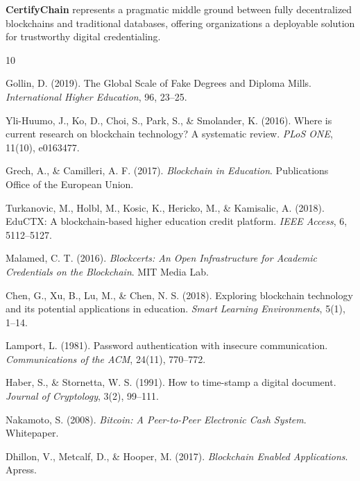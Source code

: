 \documentclass[10pt,twocolumn,a4paper]{article}
\newcommand{\certifychain}{\textbf{CertifyChain}}
\begin{document}
\certifychain{} represents a pragmatic middle ground between fully decentralized blockchains and traditional databases, offering organizations a deployable solution for trustworthy digital credentialing.

\begin{thebibliography}{10}

Gollin, D. (2019). The Global Scale of Fake Degrees and Diploma Mills. \textit{International Higher Education}, 96, 23--25.

Yli-Huumo, J., Ko, D., Choi, S., Park, S., \& Smolander, K. (2016). Where is current research on blockchain technology? A systematic review. \textit{PLoS ONE}, 11(10), e0163477.

Grech, A., \& Camilleri, A. F. (2017). \textit{Blockchain in Education}. Publications Office of the European Union.

Turkanovic, M., Holbl, M., Kosic, K., Hericko, M., \& Kamisalic, A. (2018). EduCTX: A blockchain-based higher education credit platform. \textit{IEEE Access}, 6, 5112--5127.

Malamed, C. T. (2016). \textit{Blockcerts: An Open Infrastructure for Academic Credentials on the Blockchain}. MIT Media Lab.

Chen, G., Xu, B., Lu, M., \& Chen, N. S. (2018). Exploring blockchain technology and its potential applications in education. \textit{Smart Learning Environments}, 5(1), 1--14.

Lamport, L. (1981). Password authentication with insecure communication. \textit{Communications of the ACM}, 24(11), 770--772.

Haber, S., \& Stornetta, W. S. (1991). How to time-stamp a digital document. \textit{Journal of Cryptology}, 3(2), 99--111.

Nakamoto, S. (2008). \textit{Bitcoin: A Peer-to-Peer Electronic Cash System}. Whitepaper.

Dhillon, V., Metcalf, D., \& Hooper, M. (2017). \textit{Blockchain Enabled Applications}. Apress.

\end{thebibliography}
\end{document}
